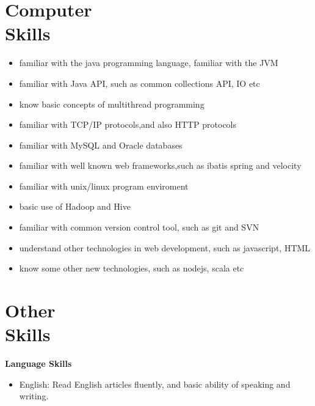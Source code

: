 \documentclass[margin]{res}
\begin{document}
\begin{resume}
\section{Computer \\ Skills}
  \begin{itemize} \itemsep -2pt
               \item familiar with the java programming language, familiar with the JVM 
               \item familiar with Java API, such as common collections API, IO etc
               \item know basic concepts of multithread programming
		    \item familiar with TCP/IP protocols,and also HTTP protocols 
               \item familiar with MySQL and Oracle databases 
               \item familiar with well known web frameworks,such as ibatis spring and velocity 
		    \item familiar with unix/linux program enviroment
               \item basic use of Hadoop and Hive 
               \item familiar with common version control tool, such as git and SVN
               \item understand other technologies in web development, such as javascript, HTML
               \item know some other new technologies, such as nodejs, scala etc
   \end{itemize}

\section{Other \\Skills}
  {\bf Language Skills}
  \begin{itemize} \itemsep -2pt
        \item English:  Read English articles fluently, and basic ability of speaking and writing.
  \end{itemize} 



\end{resume} 
\end{document}
